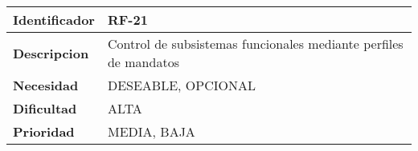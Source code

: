 \begin{center}
    \begin{tabular}{|p{2.6cm}|p{12cm}|}
    \hline
    \textbf{Identificador} & RF-21\\
    \hline
    \textbf{Descripcion} & Control de subsistemas funcionales mediante perfiles de mandatos\\
    \hline
    \textbf{Necesidad} & DESEABLE, OPCIONAL\\
    \hline
    \textbf{Dificultad} & ALTA\\
    \hline
    \textbf{Prioridad} & MEDIA, BAJA\\
    \hline
    \end{tabular}
\end{center}
